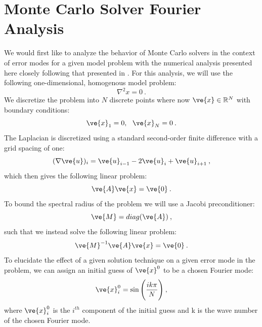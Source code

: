 \documentclass[note]{TechNote}
\begin{document}
\section{Monte Carlo Solver Fourier Analysis}
\label{sec:fourier_analysis}
We would first like to analyze the behavior of Monte Carlo solvers in
the context of error modes for a given model problem with the
numerical analysis presented here closely following that presented in
\cite{briggs_multigrid}. For this analysis, we will use the following
one-dimensional, homogenous model problem:
\begin{equation}
  \nabla^2 x = 0\:.
  \label{eq:model_problem}
\end{equation}
We discretize the problem into $N$ discrete points
where now $\ve{x} \in \mathbb{R}^N$ with boundary conditions:
\begin{equation}
  \ve{x}_1 = 0,\ \ \ve{x}_N = 0\:.
  \label{eq:boundary_conditions}
\end{equation}
The Laplacian is discretized using a standard second-order finite
difference with a grid spacing of one:
\begin{equation}
  (\nabla \ve{u})_i = \ve{u}_{i-1} - 2 \ve{u}_{i} + \ve{u}_{i+1}\:,
  \label{eq:discrete_laplacian}
\end{equation}
which then gives the following linear problem:
\begin{equation}
  \ve{A}\ve{x} = \ve{0}\:.
  \label{eq:linear_problem}
\end{equation}
To bound the spectral radius of the problem we will use a Jacobi
preconditioner:
\begin{equation}
  \ve{M} = diag(\ve{A})\:,
  \label{eq:preconditioner}
\end{equation}
such that we instead solve the following linear problem:
\begin{equation}
  \ve{M}^{-1}\ve{A}\ve{x} = \ve{0}\:.
  \label{eq:precond_problem}
\end{equation}
To elucidate the effect of a given solution technique on a given error
mode in the problem, we can assign an initial guess of $\ve{x}^0$ to
be a chosen Fourier mode:
\begin{equation}
  \ve{x}^0_i = \sin\Bigg( \frac{ik\pi}{N} \Bigg)\:,
  \label{eq:fourier_mode}
\end{equation}
where $\ve{x}^0_i$ is the $i^{th}$ component of the initial guess and
k is the wave number of the chosen Fourier mode. 
\end{document}
